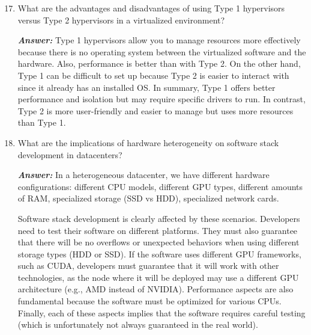 \begin{enumerate}
    \setcounter{enumi}{16}

    \item What are the advantages and disadvantages of using Type 1 hypervisors versus Type 2 hypervisors in a virtualized environment?
    
    \textcolor{Green3}{\textbf{\emph{Answer:}}} Type 1 hypervisors allow you to manage resources more effectively because there is no operating system between the virtualized software and the hardware. Also, performance is better than with Type 2. On the other hand, Type 1 can be difficult to set up because Type 2 is easier to interact with since it already has an installed OS. In summary, Type 1 offers better performance and isolation but may require specific drivers to run. In contrast, Type 2 is more user-friendly and easier to manage but uses more resources than Type 1.
    
    \item What are the implications of hardware heterogeneity on software stack development in datacenters?
    
    \textcolor{Green3}{\textbf{\emph{Answer:}}} In a heterogeneous datacenter, we have different hardware configurations: different CPU models, different GPU types, different amounts of RAM, specialized storage (SSD vs HDD), specialized network cards.

    Software stack development is clearly affected by these scenarios. Developers need to test their software on different platforms. They must also guarantee that there will be no overflows or unexpected behaviors when using different storage types (HDD or SSD). If the software uses different GPU frameworks, such as CUDA, developers must guarantee that it will work with other technologies, as the node where it will be deployed may use a different GPU architecture (e.g., AMD instead of NVIDIA). Performance aspects are also fundamental because the software must be optimized for various CPUs. Finally, each of these aspects implies that the software requires careful testing (which is unfortunately not always guaranteed in the real world).
\end{enumerate}